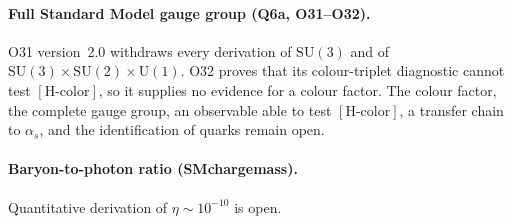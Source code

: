 \documentclass[11pt,a4paper]{article}
\newcommand{\SU}{\mathrm{SU}}
\begin{document}
  \paragraph{Full Standard Model gauge group (Q6a, O31--O32).}
    O31 version~2.0 withdraws every derivation of $\SU(3)$ and of
    $\SU(3)\times\SU(2)\times\mathrm{U}(1)$. O32 proves that its colour-triplet diagnostic cannot
    test $[\mathrm{H\text{-}color}]$, so it supplies no evidence for a colour factor.
    The colour factor, the complete gauge group, an observable able to test
    $[\mathrm{H\text{-}color}]$, a transfer chain to $\alpha_s$, and the identification of quarks remain
    open.

  \paragraph{Baryon-to-photon ratio (SMchargemass).}
    Quantitative derivation of $\eta \sim 10^{-10}$ is open.
\end{document}

